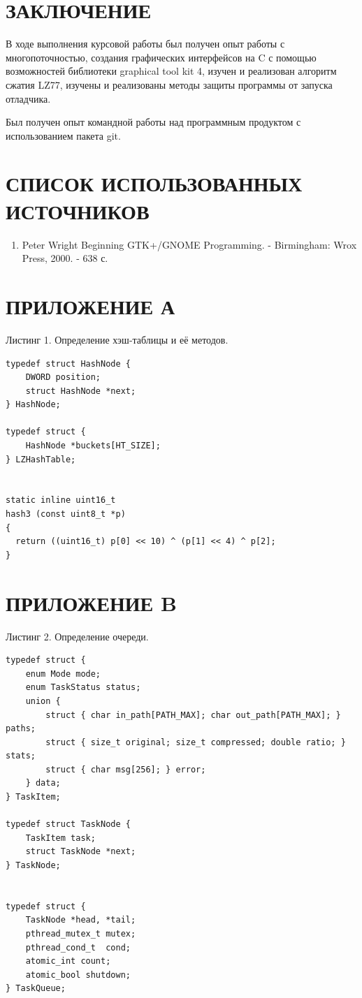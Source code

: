 \documentclass[a4paper,14pt]{extreport}
\renewcommand{\thechapter}{} %
\begin{document}
\newpage
\chapter*{ЗАКЛЮЧЕНИЕ}
В ходе выполнения курсовой работы был получен опыт работы с многопоточностью,
создания графических интерфейсов на C с помощью возможностей библиотеки
graphical tool kit 4, изучен и реализован алгоритм сжатия LZ77, изучены и
реализованы методы защиты программы от запуска отладчика.

Был получен опыт командной работы над программным продуктом с использованием
пакета git.
\newpage

\newpage
\chapter*{СПИСОК ИСПОЛЬЗОВАННЫХ ИСТОЧНИКОВ}
\begin{enumerate}
	\item Peter Wright Beginning GTK+/GNOME Programming. - Birmingham: Wrox Press, 2000. - 638 с.
\end{enumerate}

\newpage
\appendix
\renewcommand{\appendixname}{ПРИЛОЖЕНИЕ}
\renewcommand{\thechapter}{\appendixname~\Alph{chapter}} %

\chapter*{ПРИЛОЖЕНИЕ А}
Листинг 1. Определение хэш-таблицы и её методов.
\begin{verbatim}
typedef struct HashNode {
    DWORD position;
    struct HashNode *next;
} HashNode;

typedef struct {
    HashNode *buckets[HT_SIZE];
} LZHashTable;


static inline uint16_t
hash3 (const uint8_t *p)
{
  return ((uint16_t) p[0] << 10) ^ (p[1] << 4) ^ p[2];
}

\end{verbatim}
\newpage
\chapter*{ПРИЛОЖЕНИЕ B}
Листинг 2. Определение очереди.
\begin{verbatim}
typedef struct {
    enum Mode mode;
    enum TaskStatus status;
    union {
        struct { char in_path[PATH_MAX]; char out_path[PATH_MAX]; } paths;
        struct { size_t original; size_t compressed; double ratio; } stats;
        struct { char msg[256]; } error;
    } data;
} TaskItem;

typedef struct TaskNode {
    TaskItem task;
    struct TaskNode *next;
} TaskNode;


typedef struct {
    TaskNode *head, *tail;
    pthread_mutex_t mutex;
    pthread_cond_t  cond;
    atomic_int count;
    atomic_bool shutdown;
} TaskQueue;
\end{verbatim}
\end{document}
